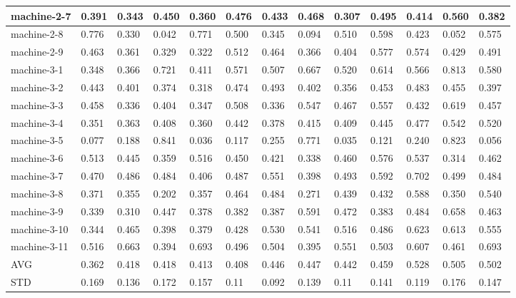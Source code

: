 \begin{table}[]
{\begin{tabular}{|l||l|l|l|l||l|l|l|l||l|l|l|l|}
			\hline
			machine-2-7     & 0.391  & 0.343 & 0.450 & 0.360 & 0.476  & 0.433 & 0.468 & 0.307 & 0.495  & 0.414        & 0.560 & 0.382 \\ 
			\hline
			machine-2-8     & 0.776  & 0.330 & 0.042 & 0.771 & 0.500  & 0.345 & 0.094 & 0.510 & 0.598  & 0.423        & 0.052 & 0.575 \\ 
			\hline
			machine-2-9     & 0.463  & 0.361 & 0.329 & 0.322 & 0.512  & 0.464 & 0.366 & 0.404 & 0.577  & 0.574        & 0.429 & 0.491 \\ 
			\hline
			machine-3-1     & 0.348  & 0.366 & 0.721 & 0.411 & 0.571  & 0.507 & 0.667 & 0.520 & 0.614  & 0.566        & 0.813 & 0.580 \\ 
			\hline
			machine-3-2     & 0.443  & 0.401 & 0.374 & 0.318 & 0.474  & 0.493 & 0.402 & 0.356 & 0.453  & 0.483        & 0.455 & 0.397 \\ 
			\hline
			machine-3-3     & 0.458  & 0.336 & 0.404 & 0.347 & 0.508  & 0.336 & 0.547 & 0.467 & 0.557  & 0.432        & 0.619 & 0.457 \\ 
			\hline
			machine-3-4     & 0.351  & 0.363 & 0.408 & 0.360 & 0.442  & 0.378 & 0.415 & 0.409 & 0.445  & 0.477        & 0.542 & 0.520 \\ 
			\hline
			machine-3-5     & 0.077  & 0.188 & 0.841 & 0.036 & 0.117  & 0.255 & 0.771 & 0.035 & 0.121  & 0.240        & 0.823 & 0.056 \\ 
			\hline
			machine-3-6     & 0.513  & 0.445 & 0.359 & 0.516 & 0.450  & 0.421 & 0.338 & 0.460 & 0.576  & 0.537        & 0.314 & 0.462 \\ 
			\hline
			machine-3-7     & 0.470  & 0.486 & 0.484 & 0.406 & 0.487  & 0.551 & 0.398 & 0.493 & 0.592  & 0.702        & 0.499 & 0.484 \\ 
			\hline
			machine-3-8     & 0.371  & 0.355 & 0.202 & 0.357 & 0.464  & 0.484 & 0.271 & 0.439 & 0.432  & 0.588        & 0.350 & 0.540 \\ 
			\hline
			machine-3-9     & 0.339  & 0.310 & 0.447 & 0.378 & 0.382  & 0.387 & 0.591 & 0.472 & 0.383  & 0.484        & 0.658 & 0.463 \\ 
			\hline
			machine-3-10    & 0.344  & 0.465 & 0.398 & 0.379 & 0.428  & 0.530 & 0.541 & 0.516 & 0.486  & 0.623        & 0.613 & 0.555 \\ 
			\hline
			machine-3-11    & 0.516  & 0.663 & 0.394 & 0.693 & 0.496  & 0.504 & 0.395 & 0.551 & 0.503  & 0.607        & 0.461 & 0.693 \\ 
			\hline
			AVG             & 0.362  & 0.418 & 0.418 & 0.413 & 0.408  & 0.446 & 0.447 & 0.442 & 0.459  & 0.528        & 0.505 & 0.502 \\ 
			\hline
			STD             & 0.169  & 0.136 & 0.172 & 0.157 & 0.11   & 0.092 & 0.139 & 0.11  & 0.141  & 0.119        & 0.176 & 0.147 \\
			\hline
		\end{tabular}
	}
\end{table}

